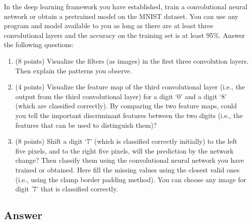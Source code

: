 \documentclass[
	12pt, %
]{../Template/fphw}
\begin{document}
\begin{problem}
In the deep learning framework you have established, train a convolutional neural network or
obtain a pretrained model on the MNIST dataset. You can use any program and model available to you as long as there
are at least three convolutional layers and the accuracy on the training set is at least 95\%. Answer the following
questions:
\begin{enumerate}[label = (\arabic*)]
\item (8 points) Visualize the filters (as images) in the first three convolution layers. Then explain the patterns you
observe.
\item (4 points) Visualize the feature map of the third convolutional layer (i.e., the output from the third convolutional
layer) for a digit ‘0’ and a digit ‘8’ (which are classified correctly). By comparing the two feature maps, could
you tell the important discriminant features between the two digits (i.e., the features that can be used to
distinguish them)?
\item  (8 points) Shift a digit ‘7’ (which is classified correctly initially) to the left five pixels, and to the right five
pixels, will the prediction by the network change? Then classify them using the convolutional neural network
you have trained or obtained. Here fill the missing values using the closest valid ones (i.e., using the clamp
border padding method). You can choose any image for digit '7' that is classified correctly.
\end{enumerate}
\end{problem}


\subsection*{Answer}
\end{document}
